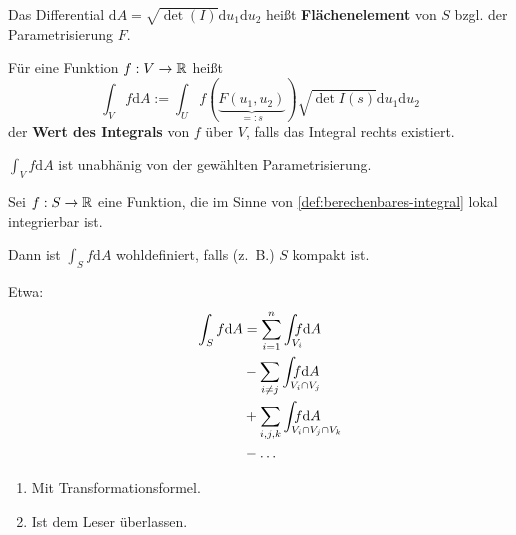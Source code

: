 \begin{definition}%
    \begin{defenum}
        \item Das Differential $\mathrm{d} A = \sqrt{\det (I)} \mathrm{d} u_1 \mathrm{d} u_2$
              heißt \textbf{Flächenelement} von $S$ bzgl. der Parametrisierung $F$.
        \item \label{def:berechenbares-integral}Für eine Funktion $f: V \rightarrow \mathbb{R}$ heißt 
              \[\int_V f \mathrm{d} A := \int_U f(\underbrace{F(u_1, u_2)}_{=: s}) \sqrt{\det I(s)} \mathrm{d} u_1 \mathrm{d} u_2\]
              der \textbf{Wert des Integrals} von $f$ über $V$, falls das Integral rechts
              existiert.
    \end{defenum}

\end{definition}

\begin{bemerkung}
    \begin{bemenum}
        \item $\int_V f \mathrm{d} A$ ist unabhänig von der gewählten Parametrisierung.
        \item Sei $f: S \rightarrow \mathbb{R}$ eine Funktion, die im Sinne von
              \cref{def:berechenbares-integral} lokal integrierbar ist.

              Dann ist $\int_S f \mathrm{d} A$ wohldefiniert, falls (z.~B.) $S$
              kompakt ist.

              Etwa:
              \begin{align*}
                \int_S f \mathrm{d} A &= \sum_{i=1}^n \int_{\mathrlap{V_i}} f \mathrm{d} A \\
                &- \sum_{i \neq j} \int_{\mathrlap{V_i \cap V_j}} f \mathrm{d} A \\
                &+ \sum_{i,j,k} \int_{\mathrlap{V_i \cap V_j \cap V_k}} f \mathrm{d} A\\
                &- \dots
              \end{align*}
    \end{bemenum}
\end{bemerkung}

\begin{beweis}\leavevmode
    \begin{enumerate}[label=\alph*)]
        \item Mit Transformationsformel.%
        \item Ist dem Leser überlassen.%
    \end{enumerate}
\end{beweis}

